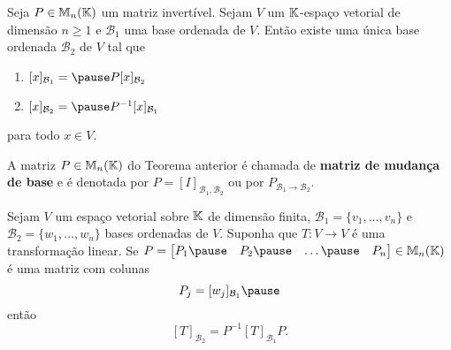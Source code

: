 \documentclass{beamer}
\begin{document}
    \begin{frame}
        \begin{teorema}
            Seja $P \in \mathbb{M}_n(\mathbb{K})$ um matriz invertível. \pause Sejam $V$ um $\mathbb{K}$-espaço vetorial de dimensão $n \ge 1$ \pause
            e $\mathcal{B}_1$ uma base ordenada de $V$. \pause Então existe uma única base ordenada $\mathcal{B}_2$ \pause de $V$
            tal que\pause
            \begin{enumerate}[label={\roman*})]
                \vspace*{.25cm}
                \item $[x]_{\mathcal{B}_1} = \pause P[x]_{\mathcal{B}_2}$\pause

                \vspace{.75cm}

                \item $[x]_{\mathcal{B}_2} = \pause P^{-1}[x]_{\mathcal{B}_1}$\pause
            \end{enumerate}

            \vspace{.2cm}

            para todo $x \in V$.
        \end{teorema}
    \end{frame}

    \begin{frame}
        \begin{definicao}
            A matriz $P \in \mathbb{M}_n(\mathbb{K})$ \pause do Teorema anterior \pause é chamada de \textbf{matriz de mudança de base} \pause
            e é denotada por $P = [I]_{{\mathcal{B}_1},{\mathcal{B}_2}}$ ou por $P_{\mathcal{B}_1 \to \mathcal{B}_2}$.
        \end{definicao}
    \end{frame}

    \begin{frame}
        \begin{teorema}
            Sejam $V$ um espaço vetorial sobre $\mathbb{K}$ \pause de dimensão finita, \pause $\mathcal{B}_1 = \{v_1,\dots,v_n\}$ \pause
            e $\mathcal{B}_2 = \{w_1,\dots,w_n\}$ \pause bases ordenadas de $V$. \pause Suponha que $T \colon V \to V$ é uma
            transformação linear. \pause Se $P = \begin{bmatrix}P_1 \pause & P_2 \pause & \dots \pause & P_n
            \end{bmatrix} \in \cp{M}_n(\cp{K})$ \pause é uma matriz com colunas\pause
            \[
                P_j = [w_j]_{\mathcal{B}_1}\pause
            \]
            então
            \[
                [T]_{\mathcal{B}_2} = P^{-1}[T]_{\mathcal{B}_1}P.
            \]
        \end{teorema}
    \end{frame}
\end{document}
